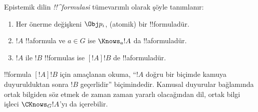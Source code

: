 \begin{defn}
  Epistemik dilin \emph{!!^{formula}s{}i} tümevarımlı olarak şöyle tanımlanır:
  \begin{enumerate}


  \item Her önerme değişkeni $\Obj p_i$, (atomik) bir
  !!{formula}{}dür.






  \item $!A$ !!a{formula} ve $a \in G$ ise $\Knows_a !A$ da
  !!a{formula}{}dür.
  
  \item $!A$ ile $!B$ !!{formula}s ise $[!A] !B$ de !!a{formula}{}dür.

\end{enumerate}
\end{defn}

!!{formula} $[!A] !B$ için amaçlanan okuma, ``$!A$ doğru bir biçimde kamuya
duyurulduktan sonra $!B$ geçerlidir'' biçimindedir. Kamusal duyurular
bağlamında ortak bilgiden söz etmek de zaman zaman yararlı olacağından dil,
ortak bilgi işleci $\CKnows_G !A$'yı da içerebilir.

